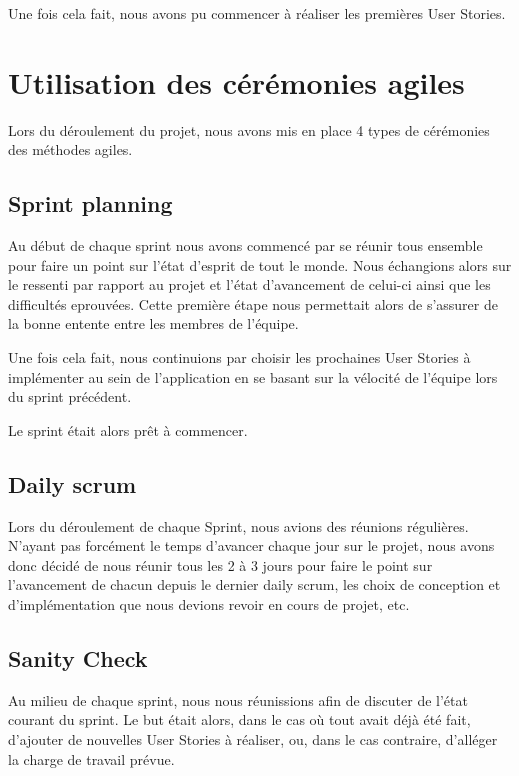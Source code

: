 \documentclass[11pt]{report}
\begin{document}
Une fois cela fait, nous avons pu commencer à réaliser les premières User Stories.

\section{Utilisation des cérémonies agiles}

Lors du déroulement du projet, nous avons mis en place 4 types de cérémonies des méthodes agiles.

\subsection{Sprint planning}

Au début de chaque sprint nous avons commencé par se réunir tous ensemble pour faire un point sur l'état d'esprit de tout le monde.
Nous échangions alors sur le ressenti par rapport au projet et l'état d'avancement de celui-ci ainsi que les difficultés eprouvées. Cette première étape
nous permettait alors de s'assurer de la bonne entente entre les membres de l'équipe.

Une fois cela fait, nous continuions par choisir les prochaines User Stories à implémenter au sein de l'application en se basant sur la vélocité
de l'équipe lors du sprint précédent.\newline

Le sprint était alors prêt à commencer.

\subsection{Daily scrum}

Lors du déroulement de chaque Sprint, nous avions des réunions régulières. N'ayant pas forcément le temps
d'avancer chaque jour sur le projet, nous avons donc décidé de nous réunir tous les 2 à 3 jours
pour faire le point sur l'avancement de chacun depuis le dernier daily scrum, les choix de conception et d'implémentation que
nous devions revoir en cours de projet, etc.

\subsection{Sanity Check}

Au milieu de chaque sprint, nous nous réunissions afin de discuter de l'état courant du sprint. Le but était alors, dans le cas
où tout avait déjà été fait, d'ajouter de nouvelles User Stories à réaliser, ou, dans le cas contraire, d'alléger la charge
de travail prévue.
\end{document}

